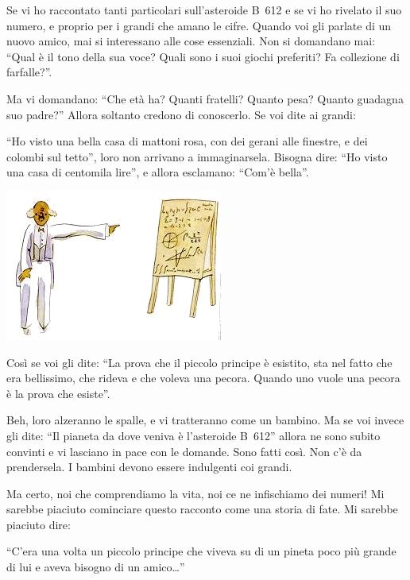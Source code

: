 \documentclass[11pt]{scrbook}
\begin{document}
Se vi ho raccontato tanti particolari sull'asteroide B~612 e se vi ho rivelato il suo numero, e proprio per i grandi che amano le cifre. Quando voi gli parlate di un nuovo amico, mai si interessano alle cose essenziali. Non si domandano mai: ``Qual è il tono della sua voce? Quali sono i suoi giochi preferiti? Fa collezione di farfalle?''.

Ma vi domandano: ``Che età ha? Quanti fratelli? Quanto pesa? Quanto guadagna suo padre?'' Allora soltanto credono di conoscerlo. Se voi dite ai grandi:

``Ho visto una bella casa di mattoni rosa, con dei gerani alle finestre, e dei colombi sul tetto'', loro non arrivano a immaginarsela. Bisogna dire: ``Ho visto una casa di centomila lire'', e allora esclamano: ``Com'è bella''.

\begin{center}
\includegraphics{img/4d}
\end{center}

Così se voi gli dite: ``La prova che il piccolo principe è esistito, sta nel fatto che era bellissimo, che rideva e che voleva una pecora. Quando uno vuole una pecora è la prova che esiste''.

Beh, loro alzeranno le spalle, e vi tratteranno come un bambino. Ma se voi invece gli dite: ``Il pianeta da dove veniva è l'asteroide B~612'' allora ne sono subito convinti e vi lasciano in pace con le domande. Sono fatti così. Non c'è da prendersela. I bambini devono essere indulgenti coi grandi.

Ma certo, noi che comprendiamo la vita, noi ce ne infischiamo dei numeri! Mi sarebbe piaciuto cominciare questo racconto come una storia di fate. Mi sarebbe piaciuto dire:

``C'era una volta un piccolo principe che viveva su di un pineta poco più grande di lui e aveva bisogno di un amico\ldots{}''
\end{document}
